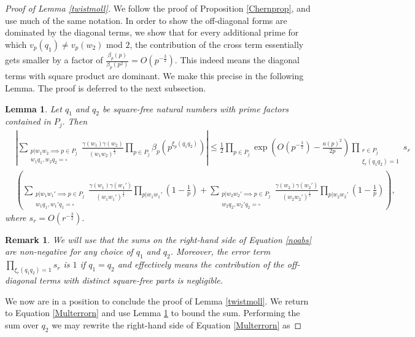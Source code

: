\documentclass[12pt]{amsart}
\numberwithin{equation}{section}
\newtheorem{lem}[thm]{Lemma}
\newtheorem*{rem}{Remark}
\numberwithin{thm}{section}
\newcommand{\1}{\mathbf 1}
\begin{document}
\begin{proof}[Proof of Lemma \ref{twistmoll}]
		We follow the proof of Proposition \ref{Chernprop}, and use much of the same notation.
		In order to show the off-diagonal forms are dominated by the diagonal terms, we show that for every additional prime for which $v_p(q_1)\ne v_p(w_2)$ mod $2$, the contribution of the cross term essentially gets smaller by a factor of $\frac{\beta_p(p)}{\beta_p(p^2)}=O(p^{-\frac{3}{2}}).$ This indeed means the diagonal terms with square product are dominant.
		We make this precise in the following Lemma. The proof is deferred to the next subsection.
		\begin{lem}\label{freebound}
			Let $q_1$ and $q_2$ be square-free natural numbers with prime factors contained in $P_{j}.$ Then \begin{align}
					\nonumber&	\left|\sum_{\substack{p|w_1w_2\implies p\in P_{j}\\ w_1q_1,w_2q_2=\square}}
					\frac{\gamma(w_1)\gamma(w_2)}{(w_1w_2)^{\frac{1}{2}}} \prod_{p\in P_{j}} 	\beta_p(p^{\xi_p(q_1q_2)})\right|\le\frac{1}{2}\prod_{p\in P_j} \exp\left(O\left(p^{-\frac{3}{2}}\right)-\frac{a(p)^2}{2p}\right) \prod_{\substack{r\in P_j\\ \xi_r(q_1q_2)=1}}s_r\\& \left(\sum_{\substack{p|w_1w_1'\implies p\in P_{j}\\ w_1q_1,w_1'q_1=\square}}
					\frac{\gamma(w_1)\gamma(w_1')}{(w_1w_1')^{\frac{1}{2}}} \prod_{p|w_1w_1'} 	\left(1-\frac{1}{p}\right)+\sum_{\substack{p|w_2w_2'\implies p\in P_{j}\\ w_2q_2,w_2'q_2=\square}}
					\frac{\gamma(w_2)\gamma(w_2')}{(w_2w_2')^{\frac{1}{2}}} \prod_{p|w_2w_2'} 	\left(1-\frac{1}{p}\right)\right),
			\label{noabs}		
			\end{align}	where $s_r=O\left(r^{-\frac{3}{2}}\right).$
		\end{lem} 
		\begin{rem} We will use that the sums on the right-hand side of Equation \eqref{noabs} are non-negative for any choice of $q_1$ and $q_2$.
			Moreover, the error term $\prod_{ \xi_r(q_1q_2)=1} 
		s_r$ is $1$ if $q_1=q_2$ and effectively means the contribution of the off-diagonal terms with distinct square-free parts is negligible. \end{rem}
		We now are in a position to conclude the proof of Lemma \ref{twistmoll}.	We return to Equation \eqref{Multerrorn} and use Lemma \ref{freebound} to bound the sum. 			
		Performing the sum over $q_2$ we may rewrite the right-hand side of Equation \eqref{Multerrorn} as   


\end{proof}
\end{document}
